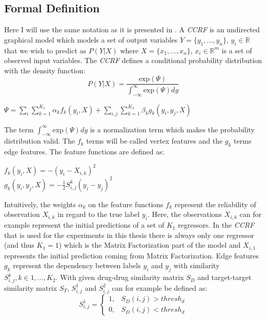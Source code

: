 \subsection{Formal Definition}
Here I will use the same notation as it is presented in \cite{baltruvsaitis2013dimensional}. A \textit{CCRF} is an undirected graphical model which models a set of output variables $Y=\{y_1,\dots,y_n\}$, $y_i \in \mathbb{R}$ that we wish to predict as $P(Y|X)$ where  $X=\{x_1,\dots,x_n\}$, $x_i \in \mathbb{R}^m$ is a set of observed input variables. The \textit{CCRF} defines a conditional probability distribution with the density function:
\begin{equation}\label{eq:CCRF_main}
P(Y|X)=\frac{\text{exp}(\Psi)}{\int_{-\infty}^{\infty} \text{exp}(\Psi) dy}
\end{equation}
\begin{center}
$\Psi=\sum_i \sum\limits_{k=1}^{K_1} \alpha_k f_k(y_i, X) + \sum_{i,j} \sum \limits_{k=1}^{K_2} \beta_k g_k (y_i, y_j,X)$
\end{center}
The term $\int_{-\infty}^{\infty}\text{exp}(\Psi) dy$ is a normalization term which makes the probability distribution valid. The $f_k$ terms will be called vertex features and the $g_k$ terms edge features. The feature functions are defined as:
\begin{center}
$f_k(y_i,X) = -(y_i - X_{i,k})^2$\\
$g_k(y_i,y_j,X) = -\frac{1}{2}S_{i,j}^k(y_i - y_j)^2$
\end{center}
Intuitively, the weights $\alpha_k$ on the feature functions $f_k$ represent the reliability of observation $X_{i,k}$ in regard to the true label $y_i$. Here, the observations $X_{i,k}$ can for example represent the initial predictions of a set of $K_1$ regressors. In the \textit{CCRF} that is used for the experiments in this thesis there is always only one regressor (and thus $K_1=1$) which is the Matrix Factorization part of the model and $X_{i,1}$ represents the initial prediction coming from Matrix Factorization.  Edge features $g_k$ represent the dependency between labels $y_i$ and $y_j$ with similarity $S_{i,j}^k, k \in 1,\dots, K_2$. With given drug-drug similarity matrix $S_D$ and target-target similarity matrix $S_T$, $S_{i,j}^1$ and $S_{i,j}^2$ can for example be defined as:
\begin{equation}
\label{simi_1}
S_{i,j}^1 =
\begin{cases}
1, & S_D(i,j) > thresh_d \\
0, & S_D(i,j) < thresh_d
\end{cases} 
\end{equation}

